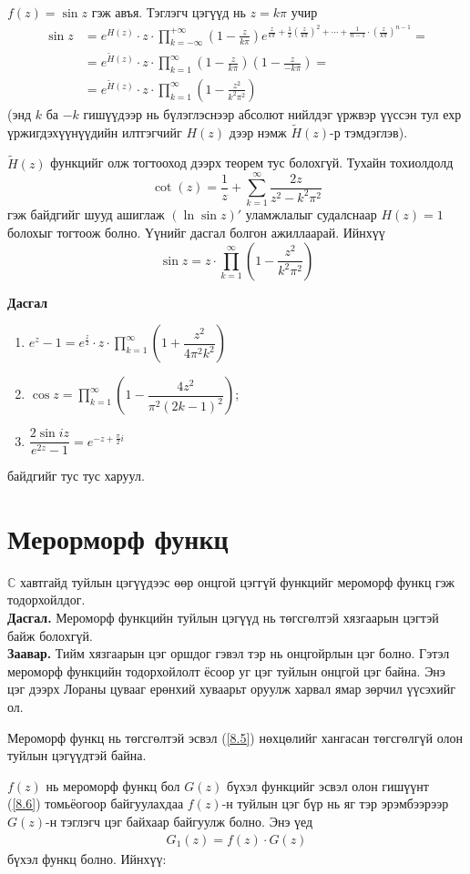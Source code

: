 \begin{exm}
$f(z)=\sin z$ гэж авъя. Тэглэгч цэгүүд нь $z=k\pi $ учир
\begin{align*}
    \sin z&=e^{H(z)}\cdot z\cdot \prod\limits_{k=-\infty}^{+\infty} \left(1-\frac{z}{k\pi}\right) e^{\frac{z}{k\pi}+\frac{1}{2}\left(\frac{z}{k\pi}\right)^2+\cdots +\frac{1}{n-1}\cdot \left(\frac{z}{k\pi}\right)^{n-1}}=\\
    &=e^{\tilde{H}(z)}\cdot z\cdot \prod\limits_{k=1}^{\infty} \left(1-\frac{z}{k\pi}\right)\left(1-\frac{z}{-k\pi}\right)=\\
    &=e^{\tilde{H}(z)}\cdot z\cdot \prod\limits_{k=1}^{\infty} \left(1-\frac{z^2}{k^2\pi^2}\right)
\end{align*}
(энд $k$ ба $-k$ гишүүдээр нь бүлэглэснээр абсолют нийлдэг үржвэр үүссэн тул ехр үржигдэхүүнүүдийн илтгэгчийг $H(z)$ дээр нэмж $\tilde{H}(z)$-р тэмдэглэв).

$\tilde{H}(z)$  функцийг олж тогтооход дээрх теорем тус болохгүй. Тухайн тохиолдолд
$$\cot (z)=\frac{1}{z}+\sum\limits_{k=1}^\infty \frac{2z}{z^2-k^2\pi^2}$$
гэж байдгийг шууд ашиглаж $(\ln\sin z)'$ уламжлалыг судалснаар $H(z)=1$ болохыг тогтоож болно. Үүнийг дасгал болгон ажиллаарай. Ийнхүү
$$\sin z=z\cdot \prod\limits_{k=1}^\infty\left(1-\frac{z^2}{k^2\pi^2}\right)$$
\end{exm}
\begin{center}
  \textbf{  Дасгал}
\end{center}
\begin{enumerate}
    \item $e^z-1=e^{\frac{z}{2}}\cdot z\cdot \prod\limits_{k=1}^\infty \left(1+\dfrac{z^2}{4\pi^2k^2}\right)$
    \item $\cos z=\prod\limits_{k=1}^\infty \left(1-\dfrac{4z^2}{\pi^2(2k-1)^2}\right);$
    \item $\dfrac{2\sin iz}{e^{2z}-1}=e^{-z+\frac{\pi}{2}i}$ 
\end{enumerate} байдгийг тус тус харуул.
\section{Мерорморф функц}
$\mathbb{C}$ хавтгайд туйлын цэгүүдээс өөр онцгой цэггүй функцийг мероморф функц гэж тодорхойлдог. \\
\textbf{Дасгал.} Мероморф функцийн туйлын цэгүүд нь төгсгөлтэй хязгаарын цэгтэй байж болохгүй.\\
\textbf{Заавар.} Тийм хязгаарын цэг оршдог гэвэл тэр нь онцгойрлын цэг болно. Гэтэл мероморф функцийн тодорхойлолт ёсоор уг цэг туйлын онцгой цэг байна. Энэ цэг дээрх Лораны цувааг ерөнхий хуваарьт оруулж харвал ямар зөрчил үүсэхийг ол.\\
\begin{cor}
Мероморф функц нь төгсгөлтэй эсвэл (\ref{8.5}) нөхцөлийг хангасан төгсгөлгүй олон туйлын цэгүүдтэй байна.
\end{cor}
$f(z)$ нь мероморф функц бол $G(z)$ бүхэл функцийг эсвэл олон гишүүнт (\ref{8.6}) томьёогоор байгуулахдаа $f(z)$-н туйлын цэг бүр нь яг тэр эрэмбээрээр $G(z)$-н тэглэгч цэг байхаар байгуулж болно. Энэ үед
\begin{eqnarray}
 G_1(z)=f(z)\cdot G(z)
\end{eqnarray}
бүхэл функц болно. Ийнхүү:

